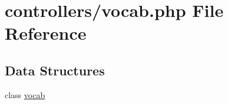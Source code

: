 \hypertarget{vocab_8php}{}\section{controllers/vocab.php File Reference}
\label{vocab_8php}
\subsection*{Data Structures}
\begin{DoxyCompactItemize}
\item 
class \mbox{\hyperlink{classvocab}{vocab}}
\end{DoxyCompactItemize}
